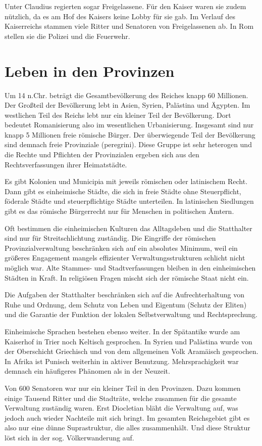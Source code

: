 \documentclass[10pt,a4paper,oneside,ngerman,numbers=noenddot]{scrartcl}
\begin{document}
Unter Claudius regierten sogar Freigelassene. Für den Kaiser waren sie zudem
nützlich, da es am Hof des Kaisers keine Lobby für sie gab. Im Verlauf des
Kaiserreichs stammen viele Ritter und Senatoren von Freigelassenen ab. In Rom
stellen sie die Polizei und die Feuerwehr.

\section*{Leben in den Provinzen}

Um 14 n.Chr. beträgt die Gesamtbevölkerung des Reiches knapp 60 Millionen.
Der Großteil der Bevölkerung lebt in Asien, Syrien, Palästina und Ägypten.
Im westlichen Teil des Reichs lebt nur ein kleiner Teil der Bevölkerung.
Dort bedeutet Romanisierung also im wesentlichen Urbanisierung. Insgesamt
sind nur knapp 5 Millionen freie römische Bürger. Der überwiegende Teil
der Bevölkerung sind demnach freie Provinziale (peregrini). Diese Gruppe
ist sehr heterogen und die Rechte und Pflichten der Provinzialen ergeben sich
aus den Rechtsverfassungen ihrer Heimatstädte.

Es gibt Kolonien und Municipia mit jeweils römischen oder latinischem Recht.
Dann gibt es einheimische Städte, die sich in freie Städte ohne Steuerpflicht,
föderale Städte und steuerpflichtige Städte unterteilen. In latinischen
Siedlungen gibt es das römische Bürgerrecht nur für Menschen in politischen Ämtern.

Oft bestimmen die einheimischen Kulturen das Alltagsleben und die Statthalter sind
nur für Streitschlichtung zuständig. Die Eingriffe der römischen Provinzialverwaltung
beschränken sich auf ein absolutes Minimum, weil ein größeres Engagement mangels
effizienter Verwaltungsstrukturen schlicht nicht möglich war. Alte Stammes- und
Stadtverfassungen bleiben in den einheimischen Städten in Kraft. In religiösen
Fragen mischt sich der römische Staat nicht ein.

Die Aufgaben der Statthalter beschränken sich auf die Aufrechterhaltung von Ruhe
und Ordnung, dem Schutz von Leben und Eigentum (Schutz der Eliten) und die Garantie
der Funktion der lokalen Selbstverwaltung und Rechtsprechung.

Einheimische Sprachen bestehen ebenso weiter. In der Spätantike wurde am Kaiserhof
in Trier noch Keltisch gesprochen. In Syrien und Palästina wurde von der
Oberschicht Griechisch und von dem allgemeinen Volk Aramäisch gesprochen. In
Afrika ist Punisch weiterhin in aktiver Benutzung. Mehrsprachigkeit war demnach
ein häufigeres Phänomen als in der Neuzeit.

Von 600 Senatoren war nur ein kleiner Teil in den Provinzen. Dazu kommen einige
Tausend Ritter und die Stadträte, welche zusammen für die gesamte Verwaltung
zuständig waren. Erst Diocletian bläht die Verwaltung auf, was jedoch auch
wieder Nachteile mit sich bringt. Im gesamten Reichsgebiet gibt es also nur eine
dünne Suprastruktur, die alles zusammenhält. Und diese Struktur löst sich in der
sog. Völkerwanderung auf.
\end{document}
